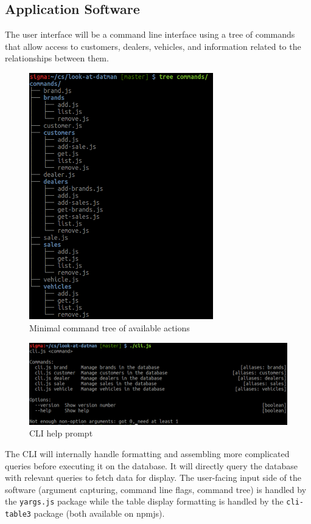 \documentclass{math}
\begin{document}
\subsection*{Application Software}
The user interface will be a command line interface using a tree of commands
that allow access to customers, dealers, vehicles, and information related to
the relationships between them.
\begin{figure}[H]
  \centering
  \includegraphics[width=8cm]{assets/phase2_command_tree.png}
  \caption{Minimal command tree of available actions}
\end{figure}
\begin{figure}[H]
  \centering
  \includegraphics[width=16cm]{assets/phase2_manpage.png}
  \caption{CLI help prompt}
\end{figure}
The CLI will internally handle formatting and assembling more complicated
queries before executing it on the database. It will directly query the database
with relevant queries to fetch data for display. The user-facing input side of
the software (argument capturing, command line flags, command tree) is handled
by the \texttt{yargs.js} package while the table display formatting is handled
by the \texttt{cli-table3} package (both available on npmjs).
\end{document}
